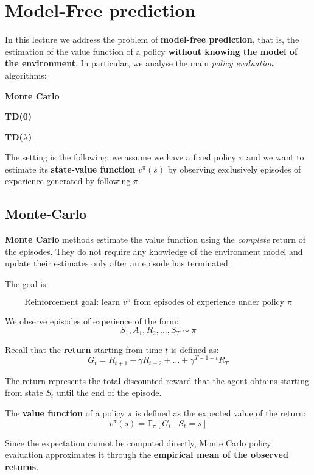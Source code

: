 \chapter{Model-Free prediction}

In this lecture we address the problem of \textbf{model-free prediction}, that is,
the estimation of the value function of a policy \textbf{without knowing the model of the environment}.
In particular, we analyse the main \textit{policy evaluation} algorithms:

\begin{compactitemize}
    \item \textbf{Monte Carlo}
    \item \textbf{TD(0)}
    \item \textbf{TD($\lambda$)}
\end{compactitemize}

The setting is the following: we assume we have a fixed policy $\pi$ and we want to estimate
its \textbf{state-value function} $v^\pi(s)$ by observing exclusively episodes of experience
generated by following $\pi$.

\section{Monte-Carlo}

\textbf{Monte Carlo} methods estimate the value function using the
\textit{complete} return of the episodes.
They do not require any knowledge of the environment model and update their estimates
only after an episode has terminated.

\noindent
The goal is:

\[
\text{Reinforcement goal: learn } v^\pi \text{ from episodes of experience under policy } \pi
\]

We observe episodes of experience of the form:
\[
S_1, A_1, R_2, \dots, S_T \sim \pi
\]

Recall that the \textbf{return} starting from time $t$ is defined as:
\[
G_t = R_{t+1} + \gamma R_{t+2} + \dots + \gamma^{T-1-t} R_T
\]

The return represents the total discounted reward that the agent obtains starting from
state $S_t$ until the end of the episode.

The \textbf{value function} of a policy $\pi$ is defined as the expected value of the return:
\[
v^\pi(s) = \mathbb{E}_\pi \left[ G_t \mid S_t = s \right]
\]

Since the expectation cannot be computed directly, Monte Carlo policy evaluation
approximates it through the \textbf{empirical mean of the observed returns}.

